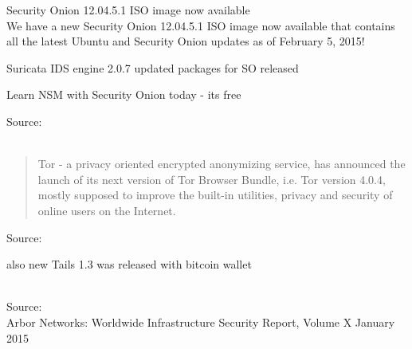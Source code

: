 \documentclass[20pt,landscape,a4paper,footrule]{foils}
\begin{document}
\begin{list1}
\item Security Onion 12.04.5.1 ISO image now available\\
We have a new Security Onion 12.04.5.1 ISO image now available that contains all the latest Ubuntu and Security Onion updates as of February 5, 2015!
\item Suricata IDS engine 2.0.7 updated packages for SO released
\end{list1}

\centerline{Learn NSM with Security Onion today - its free}

Source:\\
\\



\begin{quote}
	Tor - a privacy oriented encrypted anonymizing service, has announced the launch of its next version of Tor Browser Bundle, i.e. Tor version 4.0.4, mostly supposed to improve the built-in utilities, privacy and security of online users on the Internet.
	\end{quote}


Source:
\\

also new Tails 1.3 was released with bitcoin wallet\\
\\













Source:\\
Arbor Networks: Worldwide Infrastructure Security Report, Volume X January 2015
\end{document}
